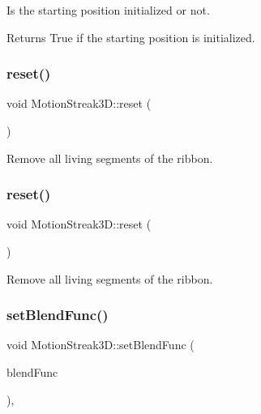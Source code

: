 Is the starting position initialized or not.

\begin{DoxyReturn}{Returns}
True if the starting position is initialized. 
\end{DoxyReturn}
\mbox{\label{classMotionStreak3D_af626dc0c3699973f3d051a4771bbf8a5}} 
\subsubsection{\texorpdfstring{reset()}{reset()}\hspace{0.1cm}{\footnotesize\ttfamily [1/2]}}
{\footnotesize\ttfamily void Motion\+Streak3\+D\+::reset (\begin{DoxyParamCaption}{ }\end{DoxyParamCaption})}

Remove all living segments of the ribbon. \mbox{\label{classMotionStreak3D_af626dc0c3699973f3d051a4771bbf8a5}} 
\subsubsection{\texorpdfstring{reset()}{reset()}\hspace{0.1cm}{\footnotesize\ttfamily [2/2]}}
{\footnotesize\ttfamily void Motion\+Streak3\+D\+::reset (\begin{DoxyParamCaption}{ }\end{DoxyParamCaption})}

Remove all living segments of the ribbon. \mbox{\label{classMotionStreak3D_a37b0b1eb59733188836e76dfed2ab181}} 
\subsubsection{\texorpdfstring{set\+Blend\+Func()}{setBlendFunc()}\hspace{0.1cm}{\footnotesize\ttfamily [1/2]}}
{\footnotesize\ttfamily void Motion\+Streak3\+D\+::set\+Blend\+Func (\begin{DoxyParamCaption}\item[{const \hyperlink{structBlendFunc}{Blend\+Func} \&}]{blend\+Func }\end{DoxyParamCaption})\hspace{0.3cm}{\ttfamily [override]}, {\ttfamily [virtual]}}

